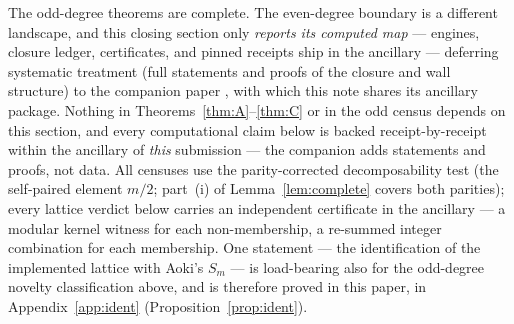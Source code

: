\documentclass[11pt]{amsart}
\theoremstyle{remark}
\begin{document}
The odd-degree theorems are complete. The even-degree boundary is a different landscape, and this
closing section only \emph{reports its computed map} --- engines, closure ledger, certificates,
and pinned receipts ship in the ancillary --- deferring systematic treatment (full statements and
proofs of the closure and wall structure) to the companion paper \cite{BNeven}, with which this
note shares its ancillary package. Nothing in Theorems~\ref{thm:A}--\ref{thm:C} or in the odd
census depends on this section, and every computational claim below is backed
receipt-by-receipt within the ancillary of \emph{this} submission --- the companion adds
statements and proofs, not data. All censuses use the
parity-corrected decomposability test (the self-paired element $m/2$; part~(i) of
Lemma~\ref{lem:complete} covers both parities); every lattice verdict below carries an
independent certificate in the ancillary --- a modular kernel witness for each non-membership, a
re-summed integer combination for each membership. One statement --- the identification of the implemented lattice with Aoki's $S_m$ --- is
load-bearing also for the odd-degree novelty classification above, and is therefore proved in
this paper, in Appendix~\ref{app:ident} (Proposition~\ref{prop:ident}).
\end{document}
